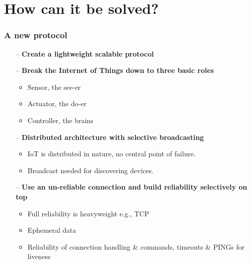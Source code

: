 \documentclass{beamer}
\begin{document}
\section{How can it be solved?} %
\label{sec:how_to_solve_it}
\begin{frame}[t]\frametitle{A new protocol}
\begin{itemize}
  \item [--] \textbf{Create a lightweight scalable protocol}
  \item [--] \textbf{Break the Internet of Things down to three basic roles}
  \begin{itemize}
    \item Sensor, the see-er
    \item Actuator, the do-er
    \item Controller, the brains
  \end{itemize}
  \item [--] \textbf{Distributed architecture with selective broadcasting}
  \begin{itemize}
    \item IoT is distributed in nature, no central point of failure.
    \item Broadcast needed for discovering devices.
  \end{itemize}
  \item [--] \textbf{Use an un-reliable connection and build reliability selectively on top}
  \begin{itemize}
    \item Full reliability is heavyweight e.g., TCP
    \item Ephemeral data
    \item Reliability of connection handling \& commands, timeouts \& PINGs for liveness
  \end{itemize}
\end{itemize}
\end{frame}
\end{document}
